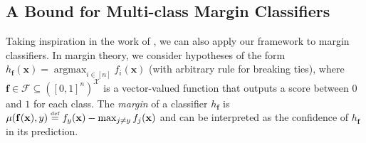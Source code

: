 \documentclass[twoside,11pt]{article}
\newcommand{\Id}[1]{\mathds{1}\hspace{-2.5pt}\left[#1\right]}
\newcommand{\D}{\mathcal{D}}
\newcommand{\F}{\mathcal{F}}
\newcommand{\f}{\mathbf{f}}
\newcommand{\x}{\mathbf{x}}
\newcommand{\X}{\mathcal{X}}
\newcommand{\eqdef}{\overset{\smash{\mbox{\tiny \rm def}}}{=}}
\DeclareMathOperator*{\Prob}{\mathds{P}}
\newcommand{\prob}[2]{\Prob_{#1}\left[#2\right]}
\DeclareMathOperator*{\argmax}{argmax}
\begin{document}
\subsection{A Bound for Multi-class Margin Classifiers}
\label{ssec:margin_classifiers}

Taking inspiration in the work of \citet{anthonybartlett99}, we can also apply our framework to margin classifiers.
In margin theory, we consider hypotheses of the form $h_\f(\x) = \argmax_{i\in[n]} f_i(\x)$ (with arbitrary rule for breaking ties), where $\f \in \F \subseteq ([0,1]^n)^\X$ is a vector-valued function that outputs a score between $0$ and $1$ for each class.
The \emph{margin}
of a classifier $h_\f$ is $\mu(\f(\x), y) \eqdef f_y(\x) - \max_{j\neq y} f_j(\x)$ and can be interpreted as the confidence of $h_\f$ in its prediction.

\end{document}
